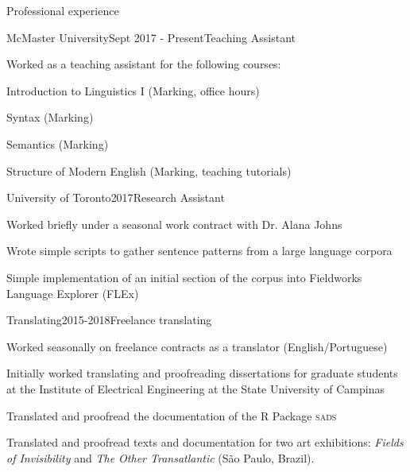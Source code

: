 \documentclass{resume} %
\begin{document}
\begin{rSection}{Professional experience}
\begin{rSubsection}{McMaster University}{Sept 2017 - Present}{Teaching Assistant}{}
\item Worked as a teaching assistant for the following courses:
\item Introduction to Linguistics I (Marking, office hours)
\item Syntax (Marking)
\item Semantics (Marking)
\item Structure of Modern English (Marking, teaching tutorials)
\end{rSubsection}

\begin{rSubsection}{University of Toronto}{2017}{Research Assistant}{}
\item Worked briefly under a seasonal work contract with Dr. Alana Johns
\item Wrote simple scripts to gather sentence patterns from a large language corpora
\item Simple implementation of an initial section of the corpus into Fieldworks Language Explorer (FLEx)

\begin{rSubsection}{Translating}{2015-2018}{Freelance translating}{}
\item Worked seasonally on freelance contracts as a translator (English/Portuguese)
\item Initially worked translating  and proofreading dissertations for graduate students at the Institute of Electrical Engineering at the State University of Campinas
\item Translated and proofread the documentation of the R Package \textsc{sads} 
\item Translated and proofread texts and documentation for two art exhibitions: \textit{Fields of Invisibility} and \textit{The Other Transatlantic} (São Paulo, Brazil).
\end{rSubsection}


\end{rSubsection}

\end{rSection}
\end{document}
